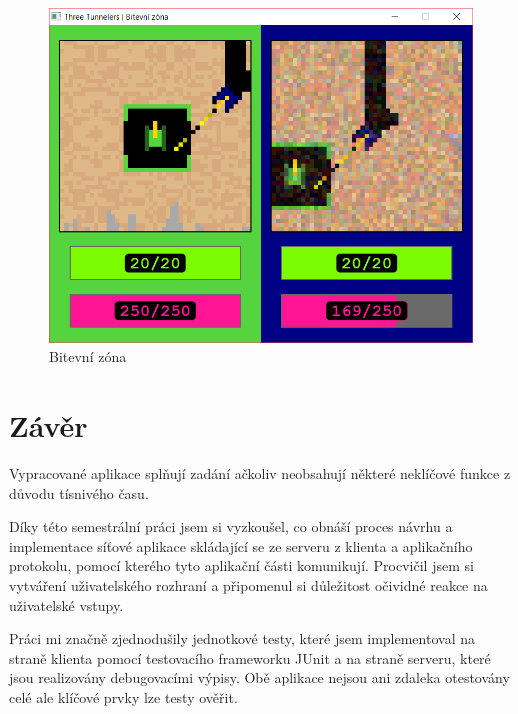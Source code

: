 \documentclass[12pt,a4paper]{article}
\let\oldsection\section
\renewcommand\section{\clearpage\oldsection}
\begin{document}
\begin{figure}[h]
    \centering
    \begin{minipage}{0.60\textwidth}
        \includegraphics[width=1\textwidth]{img/05_battle.png}
    	\caption{Bitevní zóna}
		\label{fig:battle}
    \end{minipage}\hfill
\end{figure}
\section{Závěr}
Vypracované aplikace splňují zadání ačkoliv neobsahují některé neklíčové funkce z důvodu tísnivého času.

Díky této semestrální práci jsem si vyzkoušel, co obnáší proces návrhu a implementace síťové aplikace skládající se ze serveru z klienta a aplikačního protokolu, pomocí kterého tyto aplikační části komunikují.
Procvičil jsem si vytváření uživatelského rozhraní a připomenul si důležitost očividné reakce na uživatelské vstupy.

Práci mi značně zjednodušily jednotkové testy, které jsem implementoval na straně klienta pomocí testovacího frameworku JUnit a na straně serveru, které jsou realizovány debugovacími výpisy. Obě aplikace nejsou ani zdaleka otestovány celé ale klíčové prvky lze testy ověřit.

\end{document}
